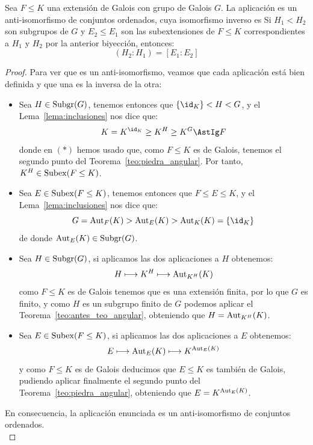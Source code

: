 \begin{teo} \label{teo:fundamental}
    Sea $F\leq K$ una extensión de Galois con grupo de Galois $G$. La aplicación 
    es un anti-isomorfismo de conjuntos ordenados, cuya isomorfismo inverso es 
    Si $H_1< H_2$ son subgrupos de $G$ y $E_2\leq E_1$ son las subextensiones de $F\leq K$ correspondientes a $H_1$ y $H_2$ por la anterior biyección, entonces:
    \begin{equation*}
        (H_2:H_1) = [E_1:E_2]
    \end{equation*}
    \begin{proof}
        Para ver que es un anti-isomorfismo, veamos que cada aplicación está bien definida y que una es la inversa de la otra:
        \begin{itemize}
            \item Sea $H\in \operatorname{Subgr}(G)$, tenemos entonces que $\{\id_K\} < H < G$, y el Lema~\ref{lema:inclusiones} nos dice que:
                \begin{equation*}
                    K = K^{\id_K} \geq K^H \geq K^G \AstIg F
                \end{equation*}
                donde en $(\ast)$ hemos usado que, como $F\leq K$ es de Galois, tenemos el segundo punto del Teorema~\ref{teo:piedra_angular}. Por tanto, $K^H\in \operatorname{Subex}(F\leq K)$.
            \item Sea $E\in \operatorname{Subex}(F\leq K)$, tenemos entonces que $F\leq E \leq K$, y el Lema~\ref{lema:inclusiones} nos dice que:
                \begin{equation*}
                    G = \Aut_F(K) > \Aut_E(K) > \Aut_K(K) = \{\id_K\}
                \end{equation*}
                de donde $\operatorname{Aut}_E(K)\in \operatorname{Subgr}(G)$.
            \item Sea $H\in \operatorname{Subgr}(G)$, si aplicamos las dos aplicaciones a $H$ obtenemos:
                \begin{equation*}
                    H \longmapsto K^H \longmapsto \operatorname{Aut}_{K^H}(K)
                \end{equation*}
                como $F\leq K$ es de Galois tenemos que es una extensión finita, por lo que $G$ es finito, y como $H$ es un subgrupo finito de $G$ podemos aplicar el Teorema~\ref{teo:antes_teo_angular}, obteniendo que $H = \operatorname{Aut}_{K^H}(K)$.
            \item Sea $E\in \operatorname{Subex}(F\leq K)$, si aplicamos las dos aplicaciones a $E$ obtenemos:
                \begin{equation*}
                    E\longmapsto \operatorname{Aut}_E(K) \longmapsto K^{\operatorname{Aut}_E(K)}
                \end{equation*}
                y como $F\leq K$ es de Galois deducimos que $E\leq K$ es también de Galois, pudiendo aplicar finalmente el segundo punto del Teorema~\ref{teo:piedra_angular}, obteniendo que $E = K^{\operatorname{Aut}_E(K)}$.
        \end{itemize}
        En consecuencia, la aplicación enunciada es un anti-isomorfismo de conjuntos ordenados.\\


\end{proof}
\end{teo}
